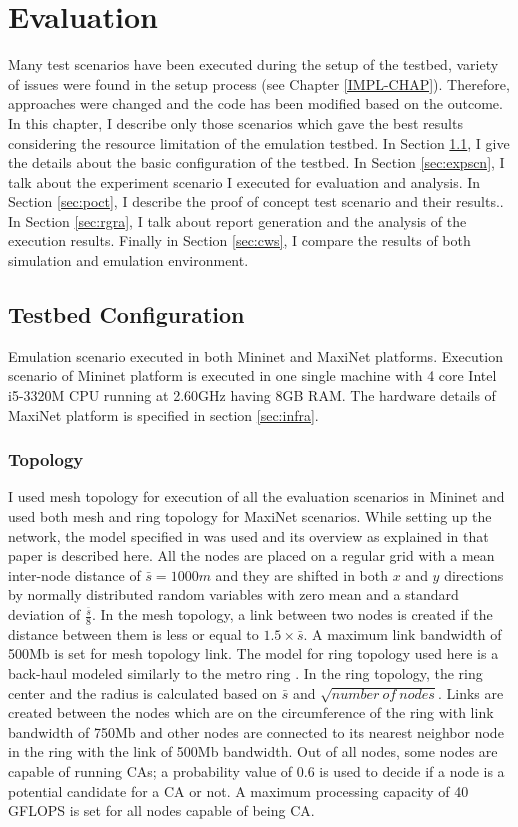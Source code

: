 \newpage
\thispagestyle{empty}
\mbox{}


\chapter{Evaluation}\label{EVAL-CHAP}
Many test scenarios have been executed during the setup of the testbed, variety of issues were found in the setup process (see Chapter \ref{IMPL-CHAP}). Therefore, approaches were changed and the code has been modified based on the outcome. In this chapter, I describe only those scenarios which gave the best results considering the resource limitation of the emulation testbed. In Section \ref{sec:tbcfg}, I give the details about the basic configuration of the testbed. In Section \ref{sec:expscn}, I talk about the experiment scenario I executed for evaluation and analysis. In Section \ref{sec:poct}, I describe the proof of concept test scenario and their results.. In Section \ref{sec:rgra}, I talk about report generation and the analysis of the execution results. Finally in Section \ref{sec:cws}, I compare the results of both simulation and emulation environment.


\section{Testbed Configuration}\label{sec:tbcfg}
Emulation scenario executed in both Mininet and MaxiNet platforms. Execution scenario of Mininet platform is executed in one single machine with 4 core Intel i5-3320M CPU running at 2.60GHz having 8GB RAM. The hardware details of MaxiNet platform is specified in section \ref{sec:infra}.

\subsection{Topology}
I used mesh topology for execution of all the evaluation scenarios in Mininet and used both mesh and ring topology for MaxiNet scenarios. While setting up the network, the model specified in \cite{7343600} was used and its overview as explained in that paper is described here. All the nodes are placed on a regular grid with a mean inter-node distance of $\bar{s} = 1000m$ and they are shifted in both $x$ and $y$ directions by normally distributed random variables with zero mean and a standard deviation of $\frac{\bar{s}}{8}$. In the mesh topology, a link between two nodes is created if the distance between them is less or equal to $1.5 \times \bar{s}$. A maximum link bandwidth of 500Mb is set for mesh topology link. The model for ring topology used here is a back-haul modeled similarly to the metro ring \cite{tbiermann}. In the ring topology, the ring center and the radius is calculated based on $\bar{s}$ and $\sqrt{number\ of\ nodes}$. Links are created between the nodes which are on the circumference of the ring with link bandwidth of 750Mb and other nodes are connected to its nearest neighbor node in the ring with the link of 500Mb bandwidth. Out of all nodes, some nodes are capable of running CAs; a probability value of 0.6 is used to decide if a node is a potential candidate for a CA or not. A maximum processing capacity of 40 GFLOPS is set for all nodes capable of being CA.

